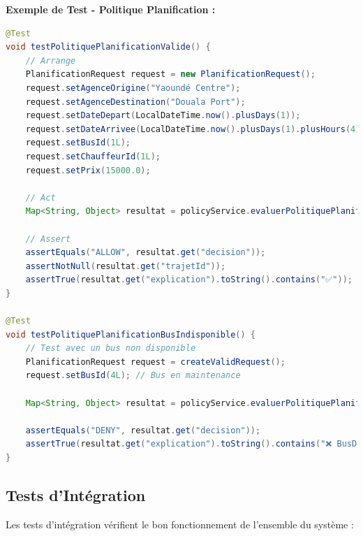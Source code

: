 \documentclass[12pt,a4paper]{article}
\begin{document}
    \begin{codebox}
        \textbf{Exemple de Test - Politique Planification :}
        \begin{lstlisting}[language=Java]
@Test
void testPolitiquePlanificationValide() {
    // Arrange
    PlanificationRequest request = new PlanificationRequest();
    request.setAgenceOrigine("Yaoundé Centre");
    request.setAgenceDestination("Douala Port");
    request.setDateDepart(LocalDateTime.now().plusDays(1));
    request.setDateArrivee(LocalDateTime.now().plusDays(1).plusHours(4));
    request.setBusId(1L);
    request.setChauffeurId(1L);
    request.setPrix(15000.0);

    // Act
    Map<String, Object> resultat = policyService.evaluerPolitiquePlanification(request);

    // Assert
    assertEquals("ALLOW", resultat.get("decision"));
    assertNotNull(resultat.get("trajetId"));
    assertTrue(resultat.get("explication").toString().contains("✅"));
}

@Test
void testPolitiquePlanificationBusIndisponible() {
    // Test avec un bus non disponible
    PlanificationRequest request = createValidRequest();
    request.setBusId(4L); // Bus en maintenance

    Map<String, Object> resultat = policyService.evaluerPolitiquePlanification(request);

    assertEquals("DENY", resultat.get("decision"));
    assertTrue(resultat.get("explication").toString().contains("❌ BusDisponible"));
}
        \end{lstlisting}
    \end{codebox}

    \subsection{Tests d'Intégration}

    Les tests d'intégration vérifient le bon fonctionnement de l'ensemble du système :
\end{document}
